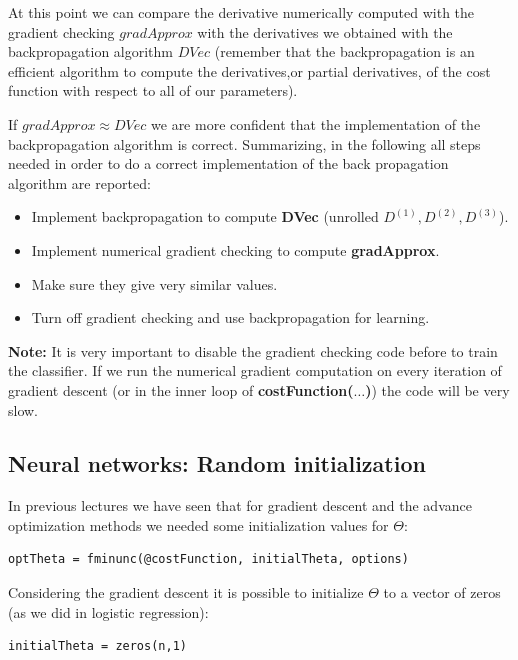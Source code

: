 At this point we can compare the derivative numerically computed with the gradient checking $gradApprox$ with the derivatives we obtained with the backpropagation algorithm $DVec$ (remember that the backpropagation is an efficient algorithm to compute the derivatives,or partial derivatives, of the cost function with respect to all of our parameters).

If $gradApprox \approx DVec$ we are more confident that the implementation of the backpropagation algorithm is correct. Summarizing, in the following all steps needed in order to do a correct implementation of the back propagation algorithm are reported:

\begin{itemize}
\item Implement backpropagation to compute {\bf DVec} (unrolled $D^{(1)}, D^{(2)}, D^{(3)}$).
\item Implement numerical gradient checking to compute {\bf gradApprox}.
\item Make sure they give very similar values.
\item Turn off gradient checking and use backpropagation for learning.
\end{itemize}

{\bf Note:} It is very important to disable the gradient checking code before to train the classifier. If we run the numerical gradient computation on every iteration of gradient descent (or in the inner loop of  {\bf costFunction($\hdots$)}) the code will be very slow.



\subsection{Neural networks: Random initialization}

In previous lectures we have seen that for gradient descent and the advance optimization methods we needed some initialization values for $\Theta$:

\begin{mdframed}[style=MyFrame]
\begin{lstlisting}
optTheta = fminunc(@costFunction, initialTheta, options)
\end{lstlisting}
\end{mdframed}

Considering the gradient descent it is possible to initialize $\Theta$ to a vector of zeros (as we did in logistic regression):
\begin{mdframed}[style=MyFrame]
\begin{lstlisting}
initialTheta = zeros(n,1)
\end{lstlisting}
\end{mdframed}

